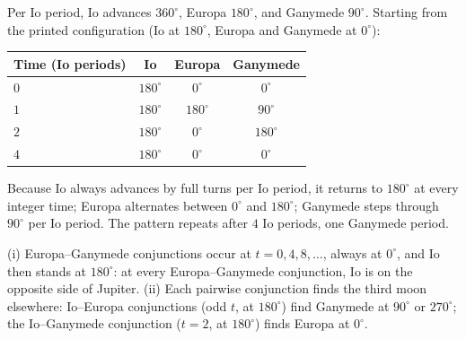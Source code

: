 \begin{solution}
Per Io period, Io advances $360^\circ$, Europa $180^\circ$, and Ganymede $90^\circ$. Starting from
the printed configuration (Io at $180^\circ$, Europa and Ganymede at $0^\circ$):

\begin{center}
\begin{tabular}{@{}lccc@{}}
\toprule
Time (Io periods) & Io & Europa & Ganymede \\
\midrule
$0$ & $180^\circ$ & $0^\circ$   & $0^\circ$   \\
$1$ & $180^\circ$ & $180^\circ$ & $90^\circ$  \\
$2$ & $180^\circ$ & $0^\circ$   & $180^\circ$ \\
$4$ & $180^\circ$ & $0^\circ$   & $0^\circ$   \\
\bottomrule
\end{tabular}
\end{center}

\begin{center}
\end{center}

Because Io always advances by full turns per Io period, it returns to $180^\circ$ at every integer
time; Europa alternates between $0^\circ$ and $180^\circ$; Ganymede steps through
$90^\circ$ per Io period. The pattern repeats after $4$ Io periods, one Ganymede period.

(i) Europa--Ganymede conjunctions occur at $t = 0, 4, 8, \ldots$, always at $0^\circ$, and Io then
stands at $180^\circ$: at every Europa--Ganymede conjunction, Io is on the opposite side of
Jupiter. (ii) Each pairwise conjunction finds the third moon elsewhere: Io--Europa conjunctions
(odd $t$, at $180^\circ$) find Ganymede at $90^\circ$ or $270^\circ$; the Io--Ganymede conjunction
($t = 2$, at $180^\circ$) finds Europa at $0^\circ$.
\end{solution}

